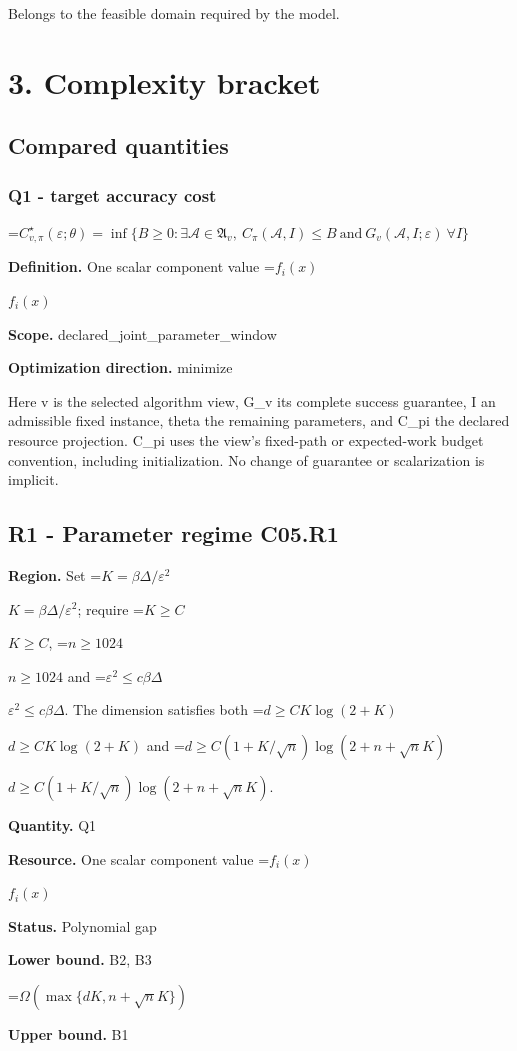 \documentclass[10pt,a4paper]{article}
\newcommand{\AtlasMath}[1]{\par\begingroup\centering\setbox0=\hbox{$\displaystyle #1$}\ifdim\wd0>1.4\linewidth\typeout{ATLAS WIDE FORMULA: \the\wd0}\fi\ifdim\wd0>\linewidth\resizebox{\linewidth}{!}{\box0}\else\box0\fi\par\endgroup}
\newcommand{\AtlasInlineMath}[1]{\begingroup\setbox0=\hbox{$#1$}\ifdim\wd0>.4\linewidth\endgroup\AtlasMath{#1}\else\endgroup$#1$\fi}
\begin{document}
Belongs to the feasible domain required by the model.

\section{3. Complexity bracket}
\subsection{Compared quantities}
\subsubsection{Q1 - target accuracy cost}
\AtlasMath{C^\star_{v,\pi}(\varepsilon;\theta)=\inf\{B\ge0:\exists\mathcal A\in\mathfrak A_v,\ C_\pi(\mathcal A,I)\le B\ \text{and}\ G_v(\mathcal A,I;\varepsilon)\ \forall I\}}
\textbf{Definition.} One scalar component value \AtlasInlineMath{f_i(x)}

\textbf{Scope.} declared\_joint\_parameter\_window

\textbf{Optimization direction.} minimize

Here v is the selected algorithm view, G\_v its complete success guarantee, I an admissible fixed instance, theta the remaining parameters, and C\_pi the declared resource projection. C\_pi uses the view's fixed-path or expected-work budget convention, including initialization. No change of guarantee or scalarization is implicit.

\subsection{R1 - Parameter regime C05.R1}
\textbf{Region.} Set \AtlasInlineMath{K=\beta\Delta/\varepsilon^2}; require \AtlasInlineMath{K\ge C}, \AtlasInlineMath{n\ge1024} and \AtlasInlineMath{\varepsilon^2\le c\beta\Delta}. The dimension satisfies both \AtlasInlineMath{d\ge CK\log(2+K)} and \AtlasInlineMath{d\ge C(1+K/\sqrt n)\log(2+n+\sqrt nK)}.

\textbf{Quantity.} Q1

\textbf{Resource.} One scalar component value \AtlasInlineMath{f_i(x)}

\textbf{Status.} Polynomial gap

\textbf{Lower bound.} B2, B3

\AtlasMath{\Omega(\max\{dK,n+\sqrt n K\})}
\textbf{Upper bound.} B1
\end{document}
